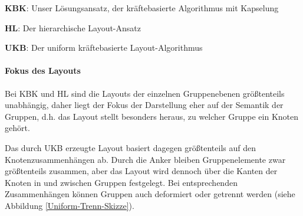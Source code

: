 \textbf{KBK}: Unser Lösungsansatz, der kräftebasierte Algorithmus mit Kapselung

\textbf{HL}: Der hierarchische Layout-Ansatz

\textbf{UKB}: Der uniform kräftebasierte Layout-Algorithmus

\paragraph*{Fokus des Layouts}
Bei KBK und HL sind die Layouts der einzelnen Gruppenebenen größtenteils unabhängig, daher liegt der Fokus der Darstellung eher auf der Semantik der Gruppen, d.h. das Layout stellt besonders heraus, zu welcher Gruppe ein Knoten gehört.

Das durch UKB erzeugte Layout basiert dagegen größtenteils auf den Knotenzusammenhängen ab. Durch die Anker bleiben Gruppenelemente zwar größtenteils zusammen, aber das Layout wird dennoch über die Kanten der Knoten in und zwischen Gruppen festgelegt. Bei entsprechenden Zusammenhängen können Gruppen auch deformiert oder getrennt werden (siehe Abbildung \ref{Uniform-Trenn-Skizze}).

